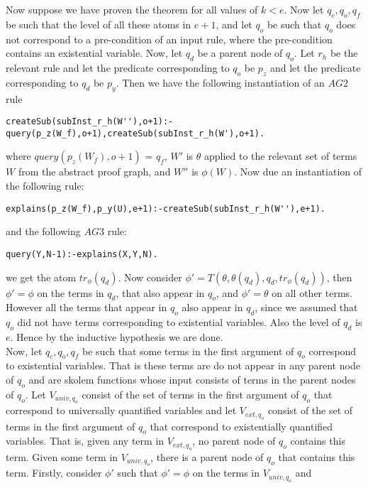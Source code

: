 Now suppose we have proven the theorem for all values of $k<e$. Now let $q_{c},q_{o},q_{f}$ be such that the level of all these atoms in $e+1$, and let $q_{o}$ be such that $q_{o}$ does not correspond to a pre-condition of an input rule, where the pre-condition contains an existential variable. Now, let $q_{d}$ be a parent node of $q_{o}$. Let $r_{h}$ be the relevant rule and let the predicate corresponding to $q_{o}$ be $p_{z}$ and let the predicate corresponding to $q_{d}$ be $p_{y}$. Then we have the following instantiation of an $AG2$ rule 
\begin{lstlisting}[frame=none]
createSub(subInst_r_h(W''),o+1):-
query(p_z(W_f),o+1),createSub(subInst_r_h(W'),o+1).
\end{lstlisting}
where $query(p_{z}(W_{f}),o+1)$ = $q_{f}$, $W'$ is $\theta$ applied to the relevant set of terms $W$ from the abstract proof graph, and $W''$ is $\phi(W)$. Now due an instantiation of the following rule:
\begin{lstlisting}[frame=none]
explains(p_z(W_f),p_y(U),e+1):-createSub(subInst_r_h(W''),e+1).
\end{lstlisting}
and the following $AG3$ rule:
\begin{lstlisting}[frame=none]
query(Y,N-1):-explains(X,Y,N). 
\end{lstlisting}
we get the atom $tr_{\phi}(q_{d})$. Now consider
$\phi'= T(\theta, \theta(q_{d}), q_{d}, tr_{\phi}(q_{d}))$, then $\phi'=\phi$
on the terms in $q_{d}$, that also appear in $q_{o}$, and $\phi' = \theta$ on
all other terms. However all the terms that appear in $q_{o}$ also appear in
$q_{d}$, since we assumed that $q_{o}$ did not have terms corresponding to
existential variables. Also the level of $q_{d}$ is $e$. Hence by the
inductive hypothesis we are done.\\
Now, let $q_{c},q_{o},q_{f}$ be such that
some terms in the first argument of $q_{o}$ correspond to existential
variables. That is these terms are do not appear in any parent node of $q_{o}$
and are skolem functions whose input consists of terms in the parent nodes of
$q_{o}$. Let $V_{univ,q_{o}}$ consist of the set of terms in the first
argument of $q_{o}$ that correspond to universally quantified variables and
let $V_{ext,q_{o}}$ consist of the set of terms in the first argument of
$q_{o}$ that correspond to existentially quantified variables. That is, given any term in $V_{ext,q_{o}}$, no parent node of $q_{o}$ contains this term. Given some term in $V_{univ,q_{o}}$, there is a parent node of $q_{o}$ that contains this term.   Firstly, consider $\phi'$ such that $\phi'=\phi$ on the terms in $V_{univ,q_{o}}$ and
